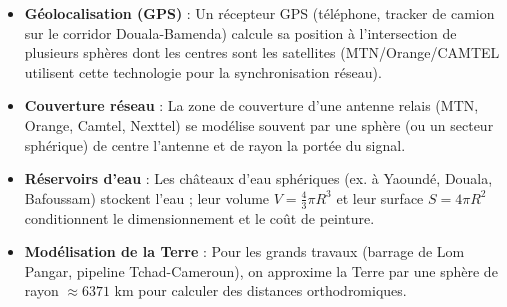 \documentclass[11pt]{article}
\begin{document}
\begin{savaistu}
\begin{itemize}
  \item \textbf{Géolocalisation (GPS)} : Un récepteur GPS (téléphone, tracker de camion sur le corridor Douala-Bamenda) calcule sa position à l'intersection de plusieurs sphères dont les centres sont les satellites (MTN/Orange/CAMTEL utilisent cette technologie pour la synchronisation réseau).
  \item \textbf{Couverture réseau} : La zone de couverture d'une antenne relais (MTN, Orange, Camtel, Nexttel) se modélise souvent par une sphère (ou un secteur sphérique) de centre l'antenne et de rayon la portée du signal.
  \item \textbf{Réservoirs d'eau} : Les châteaux d'eau sphériques (ex. à Yaoundé, Douala, Bafoussam) stockent l'eau ; leur volume $V=\frac{4}{3}\pi R^3$ et leur surface $S=4\pi R^2$ conditionnent le dimensionnement et le coût de peinture.
  \item \textbf{Modélisation de la Terre} : Pour les grands travaux (barrage de Lom Pangar, pipeline Tchad-Cameroun), on approxime la Terre par une sphère de rayon $\approx 6371$ km pour calculer des distances orthodromiques.
\end{itemize}
\end{savaistu}
\end{document}
